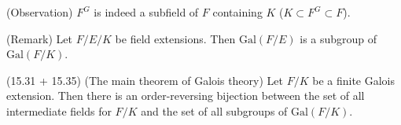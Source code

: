 \vspace{2ex}
\begin{rmk}
(Observation) $F^{G}$ is indeed a subfield of $F$ containing $K$ ($K\subset F^{G}\subset F$).
\end{rmk}
\vspace{2ex}
\begin{rmk}
(Remark) Let $F/E/K$ be field extensions. Then $\mathrm{Gal}(F/E)$ is a subgroup of $\mathrm{Gal}(F/K)$. 
\end{rmk}
\vspace{2ex}
\begin{thm}
(15.31 + 15.35) (The main theorem of Galois theory) Let $F/K$ be a finite Galois extension. Then there is an order-reversing bijection between the set of all intermediate fields for $F/K$ and the set of all subgroups of $\mathrm{Gal}(F/K)$.
\end{thm}
\vspace{2ex}


